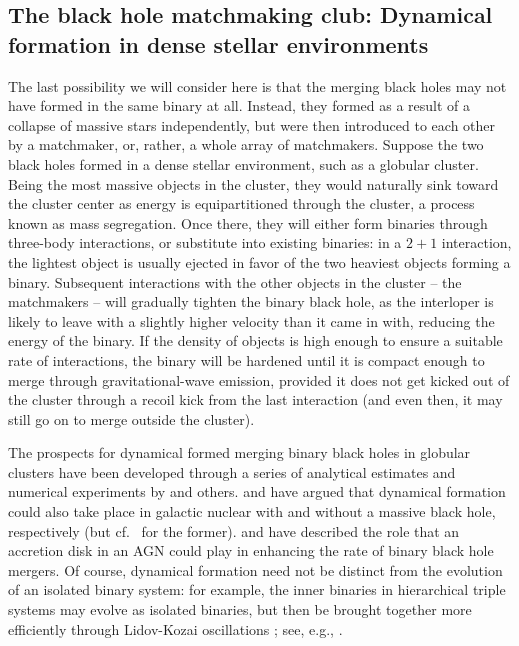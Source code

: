 \documentclass[iop,onecolumn]{revtex4}
\begin{document}
\subsection{The black hole matchmaking club: Dynamical formation in dense stellar environments}

The last possibility we will consider here is that the merging black holes may not have formed in the same binary at all.  Instead, they formed as a result of a collapse of massive stars independently, but were then introduced to each other by a matchmaker, or, rather, a whole array of matchmakers.  Suppose the two black holes formed in a dense stellar environment, such as a globular cluster.  Being the most massive objects in the cluster, they would naturally sink toward the cluster center as energy is equipartitioned through the cluster, a process known as mass segregation.  Once there, they will either form binaries through three-body interactions, or substitute into existing binaries: in a $2+1$ interaction, the lightest object is usually ejected in favor of the two heaviest objects forming a binary.  Subsequent interactions with the other objects in the cluster -- the matchmakers -- will gradually tighten the binary black hole, as the interloper is likely to leave with a slightly higher velocity than it came in with, reducing the energy of the binary.   If the density of objects is high enough to ensure a suitable rate of interactions, the binary will be hardened until it is compact enough to merge through gravitational-wave emission, provided it does not get kicked out of the cluster through a recoil kick from the last interaction (and even then, it may still go on to merge outside the cluster).  

The prospects for dynamical formed merging binary black holes in globular clusters have been developed through a series of analytical estimates and numerical experiments by \citet{SigurdssonHernquist:1993,Kulkarni:1993,PZMcMillan:2000,OLeary:2006,Banerjee:2010,Downing:2010,Morscher:2015,Mapelli:2016,Rodriguez:2016} and others.  \citet{OLeary:2008} and \citet{MillerLauburg:2008} have argued that dynamical formation could also take place in galactic nuclear with and without a massive black hole, respectively (but cf.~\citet{Tsang:2013} for the former).  \citet{Bartos:2016} and \citet{Stone:2016} have described the role that an accretion disk in an AGN could play in enhancing the rate of binary black hole mergers. Of course, dynamical formation need not be distinct from the evolution of an isolated binary system: for example, the inner binaries in hierarchical triple systems may evolve as isolated binaries, but then be brought together more efficiently through Lidov-Kozai oscillations \citep{Lidov:1959,Kozai:1960}; see, e.g., \citet{Perets,Belczynski:2015VMS}.
\end{document}
